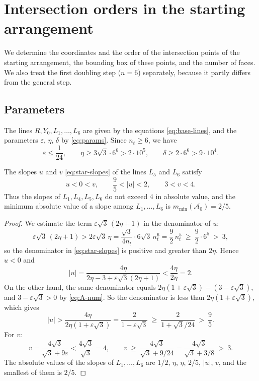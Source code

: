\section{Intersection orders in the starting arrangement}\label{app:seed}

We determine the coordinates and the order of the intersection points of the starting arrangement, the bounding box of these points, and the number of faces. We also treat the first doubling step ($n=6$) separately, because it partly differs from the general step.

\subsection{Parameters}

The lines $R,Y_0,L_1,\ldots,L_6$ are given by the equations \eqref{eq:base-lines}, and the parameters
$\varepsilon$, $\eta$, $\delta$ by \eqref{eq:params}. Since $n_t\ge6$, we have
\begin{equation}\label{eq:A-num}
\varepsilon\le\frac1{24},
\qquad
\eta\ge3\sqrt3\cdot6^6>2\cdot10^5,
\qquad
\delta\ge2\cdot6^6>9\cdot10^4.
\end{equation}

\begin{lemma}\label{lem:uv}
The slopes $u$ and $v$ \eqref{eq:star-slopes} of the lines $L_5$ and $L_6$ satisfy
\begin{equation}\label{eq:uv}
u<0<v,
\qquad
\frac95<|u|<2,
\qquad
3<v<4 .
\end{equation}
Thus the slopes of $L_1,L_4,L_5,L_6$ do not exceed 4 in absolute value, and the
minimum absolute value of a slope among $L_1,\ldots,L_6$ is $m_{\min}(\mathcal A_0)=2/5$.
\end{lemma}

\begin{proof}
We estimate the term $\varepsilon\sqrt3\,(2\eta+1)$ in the denominator of $u$:
\[
\varepsilon\sqrt3\,(2\eta+1)>2\varepsilon\sqrt3\,\eta
=\frac{\sqrt3}{4n_t}\cdot6\sqrt3\,n_t^6
=\frac92\,n_t^5\ \ge\ \frac92\cdot6^5\ >\ 3 ,
\]
so the denominator in \eqref{eq:star-slopes} is positive and greater than $2\eta$. Hence $u<0$ and
\[
|u|=\frac{4\eta}{2\eta-3+\varepsilon\sqrt3(2\eta+1)}<\frac{4\eta}{2\eta}=2 .
\]
On the other hand, the same denominator equals $2\eta(1+\varepsilon\sqrt3)-(3-\varepsilon\sqrt3)$,
and $3-\varepsilon\sqrt3>0$ by \eqref{eq:A-num}. So the denominator is less than $2\eta(1+\varepsilon\sqrt3)$, which gives
\[
|u|>\frac{4\eta}{2\eta(1+\varepsilon\sqrt3)}
=\frac2{1+\varepsilon\sqrt3}
\ \ge\ \frac2{1+\sqrt3/24}
\ >\ \frac95 .
\]
For $v$:
\[
v=\frac{4\sqrt3}{\sqrt3+9\varepsilon}<\frac{4\sqrt3}{\sqrt3}=4,
\qquad
v\ \ge\ \frac{4\sqrt3}{\sqrt3+9/24}
=\frac{4\sqrt3}{\sqrt3+3/8}
\ >\ 3 .
\]
The absolute values of the slopes of $L_1,\ldots,L_6$ are $1/2$, $\eta$, $\eta$, $2/5$, $|u|$, $v$, and the smallest of them is $2/5$.
\end{proof}

